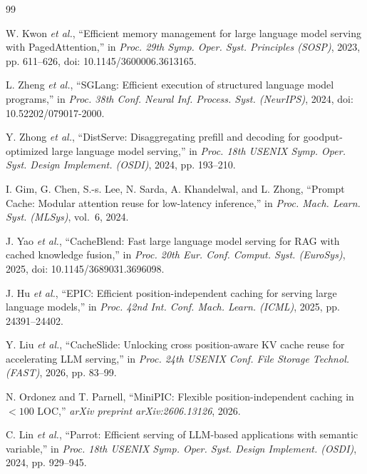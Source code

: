 \documentclass[journal]{IEEEtran}
\begin{document}

\begin{thebibliography}{99}
\fontsize{7.5}{7.8}\selectfont
\setlength{\itemsep}{-1.1pt}

W. Kwon \textit{et al.}, ``Efficient memory management for large language model serving with {PagedAttention},'' in \textit{Proc. 29th Symp. Oper. Syst. Principles (SOSP)}, 2023, pp. 611--626, doi: 10.1145/3600006.3613165.

L. Zheng \textit{et al.}, ``{SGLang}: Efficient execution of structured language model programs,'' in \textit{Proc. 38th Conf. Neural Inf. Process. Syst. (NeurIPS)}, 2024, doi: 10.52202/079017-2000.

Y. Zhong \textit{et al.}, ``{DistServe}: Disaggregating prefill and decoding for goodput-optimized large language model serving,'' in \textit{Proc. 18th USENIX Symp. Oper. Syst. Design Implement. (OSDI)}, 2024, pp. 193--210.

I. Gim, G. Chen, S.-s. Lee, N. Sarda, A. Khandelwal, and L. Zhong, ``{Prompt Cache}: Modular attention reuse for low-latency inference,'' in \textit{Proc. Mach. Learn. Syst. (MLSys)}, vol.~6, 2024.

J. Yao \textit{et al.}, ``{CacheBlend}: Fast large language model serving for RAG with cached knowledge fusion,'' in \textit{Proc. 20th Eur. Conf. Comput. Syst. (EuroSys)}, 2025, doi: 10.1145/3689031.3696098.

J. Hu \textit{et al.}, ``{EPIC}: Efficient position-independent caching for serving large language models,'' in \textit{Proc. 42nd Int. Conf. Mach. Learn. (ICML)}, 2025, pp. 24391--24402.

Y. Liu \textit{et al.}, ``{CacheSlide}: Unlocking cross position-aware KV cache reuse for accelerating LLM serving,'' in \textit{Proc. 24th USENIX Conf. File Storage Technol. (FAST)}, 2026, pp. 83--99.

N. Ordonez and T. Parnell, ``{MiniPIC}: Flexible position-independent caching in $<100$ LOC,'' \textit{arXiv preprint arXiv:2606.13126}, 2026.

C. Lin \textit{et al.}, ``Parrot: Efficient serving of LLM-based applications with semantic variable,'' in \textit{Proc. 18th USENIX Symp. Oper. Syst. Design Implement. (OSDI)}, 2024, pp. 929--945.


\end{thebibliography}
\end{document}
